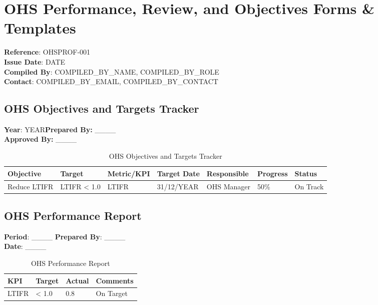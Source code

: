 \documentclass[11pt]{article}
\newcommand{\docTitle}{OHS Performance, Review, and Objectives Forms \& Templates}
\newcommand{\refNumber}{OHSPROF-001}
\newcommand{\issueDate}{{{DATE}}}
\newcommand{\year}{{{YEAR}}}
\newcommand{\compilerName}{{{COMPILED_BY_NAME}}}
\newcommand{\compilerRole}{{{COMPILED_BY_ROLE}}}
\newcommand{\compilerEmail}{{{COMPILED_BY_EMAIL}}}
\newcommand{\compilerPhone}{{{COMPILED_BY_CONTACT}}}
\begin{document}
\section*{\docTitle}
\textbf{Reference}: \refNumber \\
\textbf{Issue Date}: \issueDate \\
\textbf{Compiled By}: \compilerName, \compilerRole \\
\textbf{Contact}: \compilerEmail, \compilerPhone

\subsection*{OHS Objectives and Targets Tracker}

\textbf{Year}: \year \textbf{Prepared By:} \_\_\_\_ \\
\textbf{Approved By:} \_\_\_\_

\begin{table}[h]
    \centering
    \begin{tabular}{p{2cm}p{3cm}p{3cm}p{2cm}p{2cm}p{2cm}p{2cm}}
        \toprule
        \textbf{Objective} & \textbf{Target} & \textbf{Metric/KPI} & \textbf{Target Date} & \textbf{Responsible} & \textbf{Progress} & \textbf{Status} \\
        \midrule
        Reduce LTIFR & LTIFR < 1.0 & LTIFR & 31/12/\year & OHS Manager & 50\% & On Track \\
        \bottomrule
    \end{tabular}
    \caption{OHS Objectives and Targets Tracker}
\end{table}

\subsection*{OHS Performance Report}

\textbf{Period}: \_\_\_\_ \textbf{Prepared By}: \_\_\_\_ \\
\textbf{Date}: \_\_\_\_

\begin{table}[h]
    \centering
    \begin{tabular}{p{3cm}p{2cm}p{2cm}p{3cm}}
        \toprule
        \textbf{KPI} & \textbf{Target} & \textbf{Actual} & \textbf{Comments} \\
        \midrule
        LTIFR & < 1.0 & 0.8 & On Target \\
        \bottomrule
    \end{tabular}
    \caption{OHS Performance Report}
\end{table}
\end{document}
